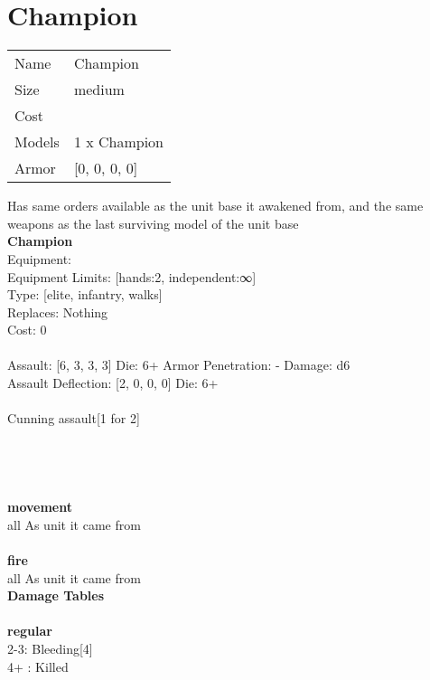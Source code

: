 \section{ Champion }

\begin{tabular}{ll}
  Name & Champion \\
  Size & medium\\
  Cost & \\
  Models & 1 x Champion\\
  Armor & [0, 0, 0, 0]\\
\end{tabular}

\noindent Has same orders available as the unit base it awakened from, and the same weapons as the last surviving model of the unit base\\ 


{\bf Champion } \\
Equipment:  \\
Equipment Limits: [hands:2, independent:∞] \\
Type: [elite, infantry, walks] \\
Replaces: Nothing \\
Cost: 0\\
\ \\
Assault: [6, 3, 3, 3] Die: 6+ Armor Penetration: - Damage: d6 \\
Assault Deflection: [2, 0, 0, 0] Die: 6+\\
\\ 
Cunning assault[1 for 2]\\ 
 
\ \\

\ \\
 
\ \\



\ \\ {\bf movement } \\
all As unit it came from \\
\ \\ {\bf fire } \\
all As unit it came from \\


{\bf Damage Tables} \\
\ \\ {\bf regular } \\
2-3: Bleeding[4] \\
4+ : Killed \\










